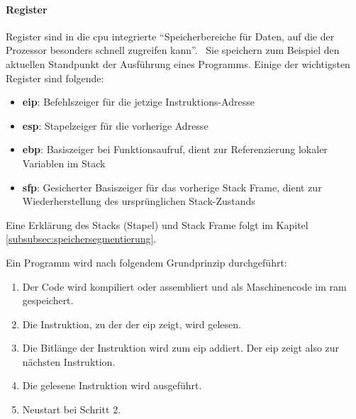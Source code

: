 \documentclass[11pt, a4paper]{article}
\begin{document}
\paragraph{Register}
Register sind in die \gls{cpu} integrierte ``Speicherbereiche für Daten, auf die der Prozessor besonders schnell zugreifen kann''.~\cite{RegisterWikipedia:online} Sie speichern zum Beispiel den aktuellen Standpunkt der Ausführung eines Programms. Einige der wichtigsten Register sind folgende:
\begin{itemize}
	\item \textbf{\gls{eip}}: Befehlszeiger für die jetzige Instruktions-Adresse \cite{UsefulRe7:online}
	\item \textbf{\gls{esp}}: Stapelzeiger für die vorherige Adresse \cite{UsefulRe7:online}
	\item \textbf{\gls{ebp}}: Basiszeiger bei Funktionsaufruf, dient zur Referenzierung lokaler Variablen im Stack \cite{UsefulRe7:online}
	\item \textbf{\gls{sfp}}: Gesicherter Basiszeiger für das vorherige Stack Frame, dient zur Wiederherstellung des ursprünglichen Stack-Zustands \cite{UsefulRe7:online}
\end{itemize}
Eine Erklärung des Stacks (Stapel) und Stack Frame folgt im Kapitel \ref{subsubsec:speichersegmentierung}.

Ein Programm wird nach folgendem Grundprinzip durchgeführt:
\begin{enumerate}
	\item Der Code wird kompiliert oder assembliert und als Maschinencode im \gls{ram} gespeichert.
	\item Die Instruktion, zu der der \gls{eip} zeigt, wird gelesen.
	\item Die Bitlänge der Instruktion wird zum \gls{eip} addiert. Der \gls{eip} zeigt also zur nächsten Instruktion.
	\item Die gelesene Instruktion wird ausgeführt.
	\item Neustart bei Schritt 2.
\end{enumerate}
\end{document}
